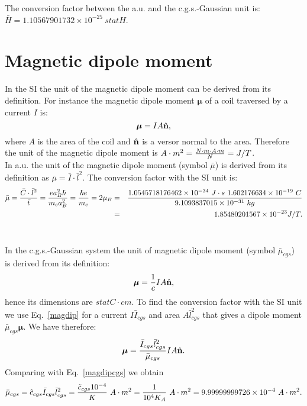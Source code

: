 \documentclass[12pt,a4paper]{article}
\def\hbarf{1.0545718176462\times 10^{-34}}
\def\e{1.602176634\times 10^{-19}}
\def\me{9.1093837015\times 10^{-31}}
\def\barmu{1.85480201567\times 10^{-23}}
\def\mutomu{9.99999999726\times 10^{-4}}
\def\barycgs{1.10567901732\times 10^{-25}}
\begin{document}
{\color{green} 
The conversion factor between the a.u. and the c.g.s.-Gaussian unit is: 
$\bar H = \barycgs\ statH$.
}

\newpage
\section{\color{coral}Magnetic dipole moment}
In the SI the unit of the magnetic dipole moment
can be derived from its definition. For instance the magnetic dipole 
moment ${\boldsymbol \mu}$ of a coil traversed by a current $I$ is:
\begin{equation}
{\boldsymbol \mu}=IA \hat {\bf n},
\label{magdip}
\end{equation}
where $A$ is the area of the coil and $\hat {\bf n}$ is a versor 
normal to the area. Therefore the unit of the magnetic dipole moment is 
$A\cdot m^2={N \cdot m \cdot  A \cdot m \over N}=J/T$.  
\\

{\color{web-blue} In a.u. the unit of the magnetic dipole moment 
(symbol $\bar \mu$) is derived from its definition as 
$\bar \mu= \bar I \cdot \bar l^2$. The conversion factor with the SI unit
is: 
\begin{eqnarray}
\bar \mu = {\bar C \cdot \bar l^2 \over \bar t}= 
{e a_B^2 \hbar \over m_e a_B^2}
= {\hbar e \over m_e}=2 \mu_B &=&
{\hbarf\ J\cdot s\ \e\ C \over \me\ kg}\nonumber \\ 
&=& \barmu J/T.
\end{eqnarray}
\\
}

{\color{orange} In the c.g.s.-Gaussian system the unit of magnetic dipole
moment (symbol $\bar \mu_{cgs}$) is derived from its definition:
\begin{equation}
{\boldsymbol \mu}={1\over c} I A \hat {\bf n},
\label{magdipcgs}
\end{equation}
hence its dimensions are 
$statC\cdot cm$. To find the conversion factor with the SI unit we use
Eq.~\ref{magdip} for a current $I \bar I_{cgs}$ and area $A \bar l_{cgs}^2$
that gives a dipole moment $\bar \mu_{cgs} {\boldsymbol \mu}$. We have
therefore:
\begin{equation}
{\boldsymbol \mu} = {\bar I_{cgs} \bar l_{cgs}^2 \over \bar \mu_{cgs} }
I A \hat {\bf n}.
\end{equation} 
Comparing with Eq.~\ref{magdipcgs} we obtain
\begin{equation}
\bar \mu_{cgs}= \tilde c_{cgs} \bar I_{cgs} \bar l_{cgs}^2= 
{\tilde c_{cgs} 10^{-4} \over K}\ A\cdot m^2 = 
{1\over 10^4 K_A}\ A\cdot m^2 = \mutomu\ A\cdot m^2.
\end{equation}
}
\\
\end{document}
